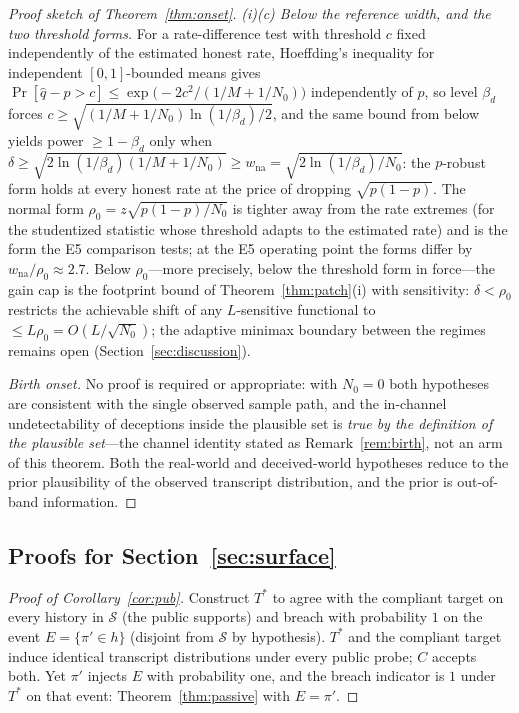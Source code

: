 \begin{proof}[Proof sketch of Theorem~\ref{thm:onset}]
\emph{(i)(c) Below the reference width, and the two threshold forms.}
For a rate-difference test with threshold $c$ fixed independently of the
estimated honest rate, Hoeffding's inequality for independent
$[0,1]$-bounded means gives
$\Pr[\hat q-\hat p>c]\le\exp\bigl(-2c^{2}/(1/M+1/N_0)\bigr)$
independently of $p$, so level $\beta_d$ forces
$c\ge\sqrt{(1/M+1/N_0)\ln(1/\beta_d)/2}$, and the same bound from below
yields power $\ge1-\beta_d$ only when
$\delta\ge\sqrt{2\ln(1/\beta_d)(1/M+1/N_0)}
\ge w_{\mathrm{na}}=\sqrt{2\ln(1/\beta_d)/N_0}$: the $p$-robust form holds
at every honest rate at the price of dropping $\sqrt{p(1-p)}$. The normal
form $\rho_0=z\sqrt{p(1-p)/N_0}$ is tighter away from the rate extremes
(for the studentized statistic whose threshold adapts to the estimated
rate) and is the form the E5 comparison tests; at the E5 operating point
the forms differ by $w_{\mathrm{na}}/\rho_0\approx2.7$. Below
$\rho_0$---more precisely, below the threshold form in force---the gain
cap is the footprint bound of Theorem~\ref{thm:patch}(i) with
sensitivity: $\delta<\rho_0$ restricts the achievable shift of any
$L$-sensitive functional to $\le L\rho_0=O(L/\sqrt{N_0})$; the adaptive
minimax boundary between the regimes remains open
(Section~\ref{sec:discussion}).

\emph{Birth onset.} No proof is required or appropriate: with $N_0=0$
both hypotheses are consistent with the single observed sample path, and
the in-channel undetectability of deceptions inside the plausible set is
\emph{true by the definition of the plausible set}---the channel identity
stated as Remark~\ref{rem:birth}, not an arm of this theorem. Both the
real-world and deceived-world hypotheses reduce to the prior plausibility
of the observed transcript distribution, and the prior is out-of-band
information.
\end{proof}

\subsection{Proofs for Section~\ref{sec:surface}}\label{app:limits}

\begin{proof}[Proof of Corollary~\ref{cor:pub}]
Construct $T^{*}$ to agree with the compliant target on every history in
$\mathcal{S}$ (the public supports) and breach with probability $1$ on the
event $E=\{\pi'\in h\}$ (disjoint from $\mathcal{S}$ by hypothesis).
$T^{*}$ and the compliant target induce identical transcript distributions
under every public probe; $C$ accepts both. Yet $\pi'$ injects $E$ with
probability one, and the breach indicator is $1$ under $T^{*}$ on that
event: Theorem~\ref{thm:passive} with $E=\pi'$.
\end{proof}

